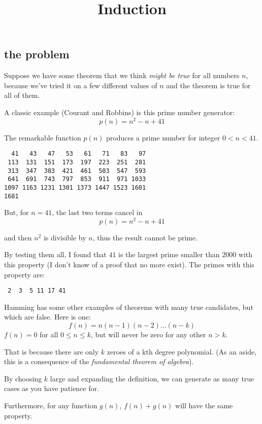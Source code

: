 \documentclass[11pt, oneside]{article}
\title{Induction}
\date{}
\begin{document}
\maketitle
\Large

\label{sec:Induction}

\subsection*{the problem}

Suppose we have some theorem that we think \emph{might be true} for all numbers $n$, because we've tried it on a few different values of $n$ and the theorem is true for all of them.  

A classic example (Courant and Robbins) is this prime number generator:
\[ p(n) = n^2 - n + 41 \]

The remarkable function $p(n)$ produces a prime number for integer $0 < n < 41$.

\begin{verbatim}
  41   43   47   53   61   71   83   97
 113  131  151  173  197  223  251  281
 313  347  383  421  461  503  547  593
 641  691  743  797  853  911  971 1033
1097 1163 1231 1301 1373 1447 1523 1601
1681
\end{verbatim}

But, for $n=41$, the last two terms cancel in
\[ p(n) = n^2 - n + 41 \]

 and then $n^2$ is divisible by $n$, thus the result cannot be prime.

By testing them all, I found that $41$ is the largest prime smaller than $2000$ with this property (I don't know of a proof that no more exist).  The primes with this property are:

\begin{verbatim}
 2  3  5 11 17 41
\end{verbatim}

Hamming has some other examples of theorems with many true candidates, but which are false.  Here is one:
\[ f(n) = n(n-1)(n-2) \dots (n-k) \]
$f(n)=0$ for all $0 \le n \le k$, but will never be zero for any other $n > k$.

That is because there are only $k$ zeroes of a kth degree polynomial.  (As an aside, this is a consequence of the \emph{fundamental theorem of algebra}).

By choosing $k$ large and expanding the definition, we can generate as many true cases as you have patience for.

Furthermore, for any function $g(n)$, $f(n) + g(n)$ will have the same property.
\end{document}
